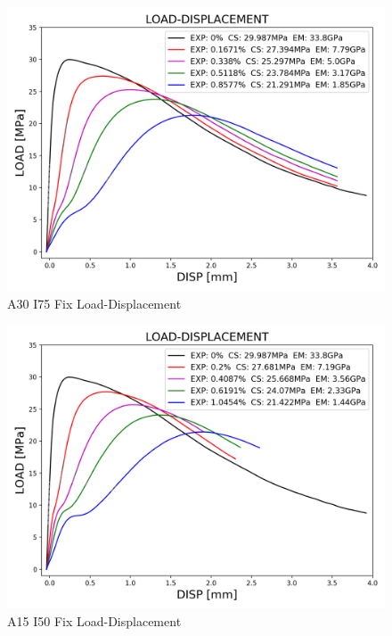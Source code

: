 
\begin{figure}[ht!]
\centering
\includegraphics[width=.8\linewidth]{Files/exp_3D/DEF/S13A30FIXX-5-LOAD-DISPLACEMENT.png}
  \caption{A30 I75 Fix Load-Displacement}
  \label{fig:A30X-5FIX_LD}
\end{figure}


\begin{figure}[ht!]
\centering
\includegraphics[width=.8\linewidth]{Files/exp_3D/DEF/S13A30FIXX-1-LOAD-DISPLACEMENT.png}
  \caption{A15 I50 Fix Load-Displacement}
  \label{fig:A30X-1FIX_LD}
\end{figure}


